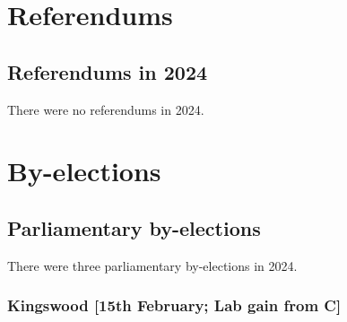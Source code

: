 \documentclass[a4paper,openany]{book}
\begin{document}



\part{Referendums}

\chapter{Referendums in 2024}

There were no referendums in 2024.




\part{By-elections}

\chapter{Parliamentary by-elections}

There were three parliamentary by-elections in 2024.

%
%
%
%
%
%
%
%
%
%
%
%
%
%

\section*{Kingswood \hspace*{\fill}\nolinebreak[1]%
	\enspace\hspace*{\fill}
	[15th February; Lab gain from C]}
\end{document}
